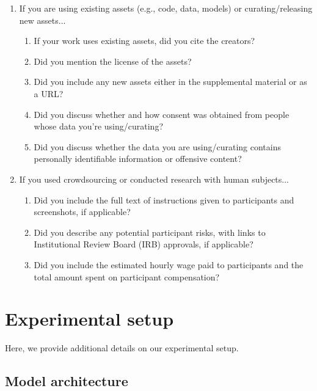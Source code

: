 \documentclass{article}
\begin{document}
\begin{enumerate}
\item If you are using existing assets (e.g., code, data, models) or curating/releasing new assets...
\begin{enumerate}
  \item If your work uses existing assets, did you cite the creators?
    \answerNA{}
  \item Did you mention the license of the assets?
    \answerNA{}
  \item Did you include any new assets either in the supplemental material or as a URL?
    \answerNA{}
  \item Did you discuss whether and how consent was obtained from people whose data you're using/curating?
    \answerNA{}
  \item Did you discuss whether the data you are using/curating contains personally identifiable information or offensive content?
    \answerNA{}
\end{enumerate}

\item If you used crowdsourcing or conducted research with human subjects...
\begin{enumerate}
  \item Did you include the full text of instructions given to participants and screenshots, if applicable?
    \answerNA{}
  \item Did you describe any potential participant risks, with links to Institutional Review Board (IRB) approvals, if applicable?
    \answerNA{}
  \item Did you include the estimated hourly wage paid to participants and the total amount spent on participant compensation?
    \answerNA{}
\end{enumerate}

\end{enumerate}

\clearpage
\appendix

\section{Experimental setup}
\label{app:setup}

Here, we provide additional details on our experimental setup.

\subsection{Model architecture}
\label{app:architecture}
\end{document}
